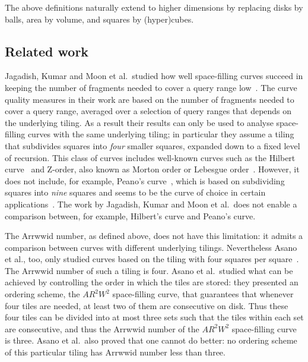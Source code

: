 \documentclass[11pt,a4paper]{article}
\newcommand{\ARRWW}{$AR^2W^2$\xspace}
\begin{document}
The above definitions naturally extend to higher dimensions by replacing disks by balls, area by volume, and squares by (hyper)cubes.

\subsection{Related work}
Jagadish, Kumar and Moon et al.\ studied how well space-filling curves succeed in keeping the number of fragments needed to cover a query range low~\cite{Jagadish1990,Jagadish1997,Kumar1994,Moon2001}. The curve quality measures in their work are based on the number of fragments needed to cover a query range, averaged over a selection of query ranges that depends on the underlying tiling. As a result their results can only be used to analyse space-filling curves with the same underlying tiling; in particular they assume a tiling that subdivides squares into \emph{four} smaller squares, expanded down to a fixed level of recursion. This class of curves includes well-known curves such as the Hilbert curve~\cite{Hilbert1891} and Z-order, also known as Morton order or Lebesgue order~\cite{Lebesgue1904}. However, it does not include, for example, Peano's curve~\cite{Peano1890}, which is based on subdividing squares into \emph{nine} squares and seems to be the curve of choice in certain applications~\cite{Bader2006a,Voorhies1991}. The work by Jagadish, Kumar and Moon et al.\ does not enable a comparison between, for example, Hilbert's curve and Peano's curve.

The Arrwwid number, as defined above, does not have this limitation: it admits a comparison between curves with different underlying tilings. Nevertheless Asano et al., too, only studied curves based on the tiling with four squares per square~\cite{Asano1997}. The Arrwwid number of such a tiling is four. Asano et al.\ studied what can be achieved by controlling the order in which the tiles are stored: they presented an ordering scheme, the \ARRWW space-filling curve, that guarantees that whenever four tiles are needed, at least two of them are consecutive on disk. Thus these four tiles can be divided into at most three sets such that the tiles within each set are consecutive, and thus the Arrwwid number of the \ARRWW space-filling curve is three. Asano et al.\ also proved that one cannot do better: no ordering scheme of this particular tiling has Arrwwid number less than three.
\end{document}
